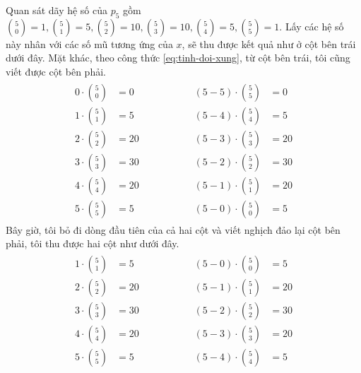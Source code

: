 \documentclass[12pt]{article} %
\begin{document}
Quan sát dãy hệ số của \(p_5\) gồm \(\binom{5}{0}=1, \binom{5}{1}=5, \binom{5}{2}=10, \binom{5}{3}=10, \binom{5}{4}=5, \binom{5}{5}=1\). Lấy các hệ số này nhân với các số mũ tương ứng của \(x\), sẽ thu được kết quả như ở cột bên trái dưới đây. Mặt khác, theo công thức \eqref{eq:tinh-doi-xung}, từ cột bên trái, tôi cũng viết được cột bên phải. 
\begin{align*}
    \begin{aligned}
        0\cdot\binom{5}{0}&=0 \\
        1\cdot\binom{5}{1}&=5 \\
        2\cdot\binom{5}{2}&=20 \\
        3\cdot\binom{5}{3}&=30 \\
        4\cdot\binom{5}{4}&=20 \\
        5\cdot\binom{5}{5}&=5
    \end{aligned}
    \hspace{2cm}
    \begin{aligned}
        (5-5)\cdot\binom{5}{5}&=0 \\
        (5-4)\cdot\binom{5}{4}&=5 \\
        (5-3)\cdot\binom{5}{3}&=20 \\
        (5-2)\cdot\binom{5}{2}&=30 \\
        (5-1)\cdot\binom{5}{1}&=20 \\
        (5-0)\cdot\binom{5}{0}&=5
    \end{aligned}
\end{align*}
Bây giờ, tôi bỏ đi dòng đầu tiên của cả hai cột và viết nghịch đảo lại cột bên phải, tôi thu được hai cột như dưới đây.
\begin{align*}
    \begin{aligned}
        1\cdot\binom{5}{1}&=5 \\
        2\cdot\binom{5}{2}&=20 \\
        3\cdot\binom{5}{3}&=30 \\
        4\cdot\binom{5}{4}&=20 \\
        5\cdot\binom{5}{5}&=5
    \end{aligned}
    \hspace{2cm}
    \begin{aligned}
        (5-0)\cdot\binom{5}{0}&=5 \\
        (5-1)\cdot\binom{5}{1}&=20 \\
        (5-2)\cdot\binom{5}{2}&=30 \\
        (5-3)\cdot\binom{5}{3}&=20 \\
        (5-4)\cdot\binom{5}{4}&=5 
    \end{aligned}
\end{align*}
\end{document}
